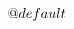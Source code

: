 {\[{{\newif\ifpgfmanualprettyprinterfoundterminator

\def\pgfmanualprettyprinterhandlecollectedargsVtwo@default#1#2{%
    \if1#2%
        \pgfmanualprettyprinterfoundterminatortrue
    \else
        \pgfmanualprettyprinterfoundterminatorfalse
    \fi
    \pgfmanualprettyprinterhandlecollectedargs{#1}%
}%
\def\pgfmanualprettyprintercollectupto@restore@callback{%
    \let\pgfmanualprettyprinterhandlecollectedargsVtwo=\pgfmanualprettyprinterhandlecollectedargsVtwo@default
}%
\pgfmanualprettyprintercollectupto@restore@callback

%
%
%
%
\def\pgfmanualprettyprintercollectupto#1#2{%
    \pgfmanualprettyprinterarghasunmatchedbracesfalse
    \def\pgfmanualprettyprinterterminator{}%
    \begingroup
    \def\pgfmanual@loc@delimittokens{#1}%
    \toksdef\t@afterpgfmanualprettyprinterhandlecollected=10
    \t@afterpgfmanualprettyprinterhandlecollected={#2}%
    \let\c@pgfmanual@pretty@openbracecount=\c@pgf@counta
    \c@pgfmanual@pretty@openbracecount=0
    \toksdef\t@pgfmanual@currentarg=0
    \t@pgfmanual@currentarg={}%
    \pgfmanual@pretty@collectupto@loop
}%

\def\pgfmanualprettyprinterterminator{}

}}\]}
